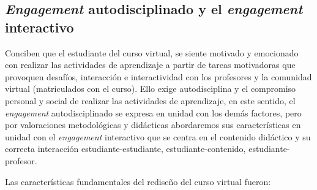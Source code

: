 \documentclass{textolivre}
\begin{document}
\subsection{\emph{Engagement} autodisciplinado y el \emph{engagement} interactivo}
Conciben que el estudiante del curso virtual, se siente motivado y emocionado con realizar las actividades de aprendizaje a partir de tareas motivadoras que provoquen desafíos, interacción e interactividad \cite{mohd2020} %
con los profesores y la comunidad virtual (matriculados con el curso). Ello exige autodisciplina y el compromiso personal y social de realizar las actividades de aprendizaje, en este sentido, el \emph{engagement} autodisciplinado se expresa en unidad con los demás factores, pero por valoraciones metodológicas y didácticas abordaremos sus características en unidad con el \emph{engagement} interactivo que se centra en el contenido didáctico y su correcta interacción estudiante-estudiante, estudiante-contenido, estudiante-profesor.

Las características fundamentales del rediseño del curso virtual fueron:
\end{document}
